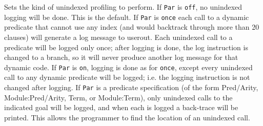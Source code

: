\begin{description}

Sets the kind of unindexed profiling to perform.  If {\tt Par} is
\texttt{off},  no
unindexed logging will be done.  This is the default.  If {\tt Par}
is \texttt{once}  each call to a dynamic predicate that cannot use any index (and
would backtrack through more than 20 clauses) will generate a log
message to userout.  Each unindexed call to a predicate will be logged
only once; after logging is done, the log instruction is changed to a
branch, so it will never produce another log message for that dynamic
code.  If {\tt Par} is \texttt{on}, logging is done as for \texttt{once}, except every
unindexed call to any dynamic predicate will be logged; i.e. the
logging instruction is not changed after logging.  If {\tt Par} is a
predicate specification (of the form Pred/Arity, Module:Pred/Arity,
Term, or Module:Term), only unindexed calls to the indicated goal will
be logged, and when each is logged a back-trace will be printed.  This
allows the programmer to find the location of an unindexed call.
\end{description}

